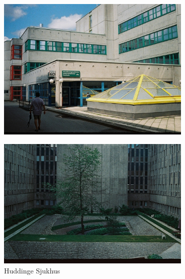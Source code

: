 \documentclass{article}
\begin{document}
\begin{figure}
	\centering
	\includegraphics[keepaspectratio, width=0.83\textwidth]{innergaard2} \\

	\vspace*{-0.3mm}

	\includegraphics[keepaspectratio, width=0.83\textwidth]{innergaard1}
	\caption{Huddinge Sjukhus}
\end{figure}
\end{document}
